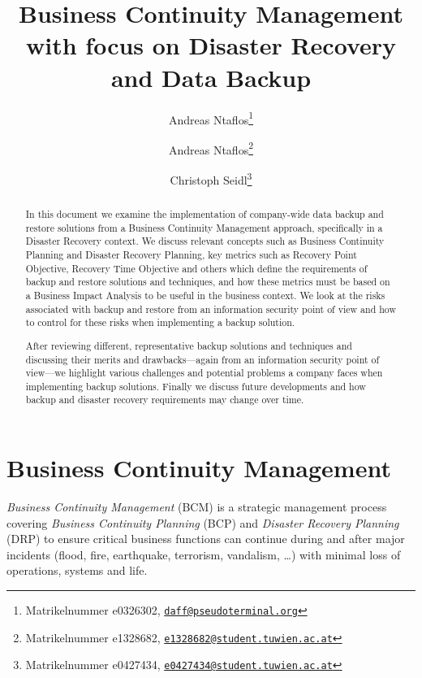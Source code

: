 \documentclass[a4paper,11pt,onecolumn]{scrartcl}
\newcommand{\code}[1]{\small\texttt{#1}\normalsize}
\begin{document}
\title{Business Continuity Management with focus on Disaster Recovery
	and Data Backup}
\publishers{\small{Organizational Aspects of IT Security\\VU 2.0 188.312 2014W}}
\subject{Assignment 1}

\author{Andreas Ntaflos\thanks{Matrikelnummer e0326302, \href{mailto:daff@pseudoterminal.org}{\code{daff@pseudoterminal.org}}}
\and Andreas Ntaflos\thanks{Matrikelnummer e1328682, \href{mailto:e1328682@student.tuwien.ac.at}{\code{e1328682@student.tuwien.ac.at}}}
\and Christoph Seidl\thanks{Matrikelnummer e0427434, \href{mailto:e0427434@student.tuwien.ac.at}{\code{e0427434@student.tuwien.ac.at}}}}

\maketitle

\begin{abstract}
In this document we examine the implementation of company-wide data
backup and restore solutions from a Business Continuity Management
approach, specifically in a Disaster Recovery context. We discuss
relevant concepts such as Business Continuity Planning and Disaster
Recovery Planning, key metrics such as Recovery Point Objective,
Recovery Time Objective and others which define the requirements of
backup and restore solutions and techniques, and how these metrics must
be based on a Business Impact Analysis to be useful in the business
context. We look at the risks associated with backup and restore from an
information security point of view and how to control for these risks
when implementing a backup solution.

After reviewing different, representative backup solutions and
techniques and discussing their merits and drawbacks---again from an
information security point of view---we highlight various challenges and
potential problems a company faces when implementing backup solutions.
Finally we discuss future developments and how backup and disaster
recovery requirements may change over time.
\end{abstract}

\section{Business Continuity Management}

\emph{Business Continuity Management} (BCM) is a strategic management
process covering \emph{Business Continuity Planning} (BCP) and
\emph{Disaster Recovery Planning} (DRP) to ensure critical business
functions can continue during and after major incidents (flood, fire,
earthquake, terrorism, vandalism, \ldots) with minimal
loss of operations, systems and life.
\end{document}
